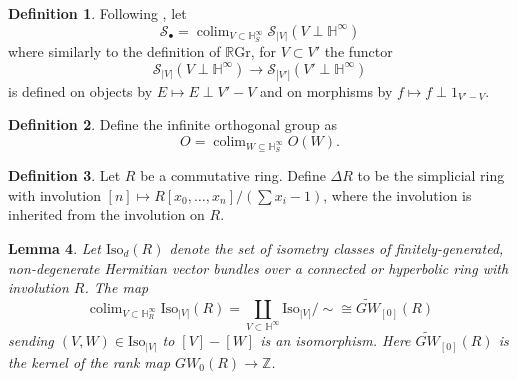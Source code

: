 \documentclass[edeposit,fullpage]{uiucthesis2009}
\newcommand{\Z}{\mathbb Z}
\newcommand{\mbb}{\mathbb}
\newcommand{\mc}{\mathcal}
\newcommand{\RGr}{\mathbb R\mathrm{Gr}}
\newcommand{\Iso}{\mathrm{Iso}}
\DeclareMathOperator*{\colim}{colim}
\theoremstyle{plain}
\newtheorem{lemma}{Lemma}
\numberwithin{lemma}{section}
\theoremstyle{definition}
\newtheorem{definition}[lemma]{Definition}
\begin{document}
\begin{definition}
Following \cite{SchTri}, let
\[
\mc S_\bullet = \colim_{V \subset \mbb H^\infty_S} \mc S_{|V|}(V \perp
\mbb H^\infty)
\]
where similarly to the definition of $\RGr$, for $V \subset V'$ the
functor 
\[
\mc S_{|V|}(V \perp
\mbb H^\infty) \rightarrow \mc S_{|V'|}(V' \perp
\mbb H^\infty)
\]
is defined on objects by $E \mapsto E \perp V'-V$ and on morphisms by
$f \mapsto f \perp 1_{V'-V}$. 
\end{definition}

\begin{definition}
Define the infinite orthogonal group as
\[
O = \colim_{W \subseteq \mbb H^\infty_S} O(W).
\]
\end{definition}

\begin{definition}
Let $R$ be a commutative ring. Define $\Delta R$ to be the simplicial ring with involution $[n] \mapsto
R[x_0,\dots,x_n]/(\sum x_i -1)$, where the involution is inherited
from the involution on $R$.
\end{definition}


\begin{lemma}
Let $\Iso_d(R)$ denote the set of isometry classes of finitely-generated, non-degenerate
Hermitian vector bundles over a connected or hyperbolic ring with
involution $R$. The map
\[
\colim_{V \subset \mbb H^\infty_R} \Iso_{|V|}(R) = \coprod_{V \subset
  \mbb H^\infty} \Iso_{|V|}/\sim \cong \widetilde{GW}_{[0]}(R)
\]
sending $(V,W) \in \Iso_{|V|}$ to $[V] - [W]$ is an isomorphism. 
Here $\widetilde{GW}_{[0]}(R)$ is the kernel of the rank map $GW_0(R)
\rightarrow \Z$.
\end{lemma}
\end{document}
